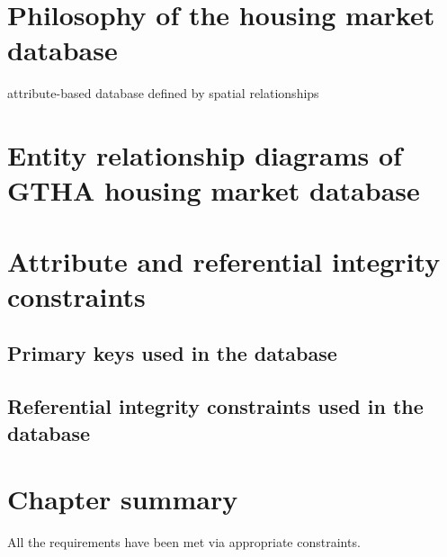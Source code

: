 \section{Philosophy of the housing market database} \label{sec:housing_market_database_philosophy}

attribute-based database defined by spatial relationships

\section{Entity relationship diagrams of GTHA housing market database} \label{sec:entity_relationship_diagrams_in_gtha_database}


\section{Attribute and referential integrity constraints} \label{sec:constraints_database}

\subsection{Primary keys used in the database} \label{subsec:primary_keys_in_gtha_database}


\subsection{Referential integrity constraints used in the database} \label{subsec:referential_integrity_constraints_in_gtha_database}


\section{Chapter summary} \label{sec:rdbms_design_summary}

All the requirements have been met via appropriate constraints.

